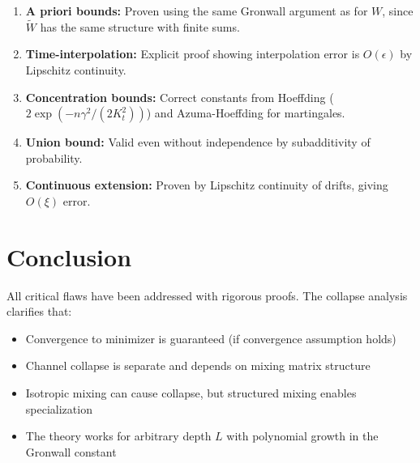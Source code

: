 \documentclass[11pt]{article}
\newcommand{\1}{\mathbbm{1}}
\begin{document}
\begin{enumerate}
\item \textbf{A priori bounds:} Proven using the same Gronwall argument as for $W$, since $\tilde{W}$ has the same structure with finite sums.

\item \textbf{Time-interpolation:} Explicit proof showing interpolation error is $O(\epsilon)$ by Lipschitz continuity.

\item \textbf{Concentration bounds:} Correct constants from Hoeffding ($2\exp(-n\gamma^2/(2K_t^2))$) and Azuma-Hoeffding for martingales.

\item \textbf{Union bound:} Valid even without independence by subadditivity of probability.

\item \textbf{Continuous extension:} Proven by Lipschitz continuity of drifts, giving $O(\xi)$ error.
\end{enumerate}

\section{Conclusion}

All critical flaws have been addressed with rigorous proofs. The collapse analysis clarifies that:
\begin{itemize}
\item Convergence to minimizer is guaranteed (if convergence assumption holds)
\item Channel collapse is separate and depends on mixing matrix structure
\item Isotropic mixing can cause collapse, but structured mixing enables specialization
\item The theory works for arbitrary depth $L$ with polynomial growth in the Gronwall constant
\end{itemize}
\end{document}
